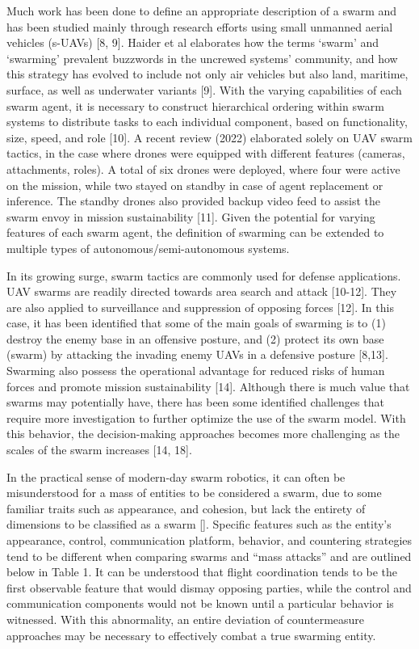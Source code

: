Much work has been done to define an appropriate description of a swarm and has been studied mainly through research efforts using small unmanned aerial vehicles (s-UAVs) [8, 9]. Haider et al elaborates how the terms ‘swarm’ and ‘swarming’ prevalent buzzwords in the uncrewed systems’ community, and how this strategy has evolved to include not only air vehicles but also land, maritime, surface, as well as underwater variants [9]. With the varying capabilities of each swarm agent, it is necessary to construct hierarchical ordering within swarm systems to distribute tasks to each individual component, based on functionality, size, speed, and role [10]. A recent review (2022) elaborated solely on UAV swarm tactics, in the case where drones were equipped with different features (cameras, attachments, roles). A total of six drones were deployed, where four were active on the mission, while two stayed on standby in case of agent replacement or inference. The standby drones also provided backup video feed to assist the swarm envoy in mission sustainability [11]. Given the potential for varying features of each swarm agent, the definition of swarming can be extended to multiple types of autonomous/semi-autonomous systems. 


In its growing surge, swarm tactics are commonly used for defense applications. UAV swarms are readily directed towards area search and attack [10-12]. They are also applied to surveillance and suppression of opposing forces [12]. In this case, it has been identified that some of the main goals of swarming is to (1) destroy the enemy base in an offensive posture, and (2) protect its own base (swarm) by attacking the invading enemy UAVs in a defensive posture [8,13]. Swarming also possess the operational advantage for reduced risks of human forces and promote mission sustainability [14]. Although there is much value that swarms may potentially have, there has been some identified challenges that require more investigation to further optimize the use of the swarm model. With this behavior, the decision-making approaches becomes more challenging as the scales of the swarm increases [14, 18].


In the practical sense of modern-day swarm robotics, it can often be misunderstood for a mass of entities to be considered a swarm, due to some familiar traits such as appearance, and cohesion, but lack the entirety of dimensions to be classified as a swarm []. Specific features such as the entity’s appearance, control, communication platform, behavior, and countering strategies tend to be different when comparing swarms and “mass attacks” and are outlined below in Table 1. It can be understood that flight coordination tends to be the first observable feature that would dismay opposing parties, while the control and communication components would not be known until a particular behavior is witnessed. With this abnormality, an entire deviation of countermeasure approaches may be necessary to effectively combat a true swarming entity.

